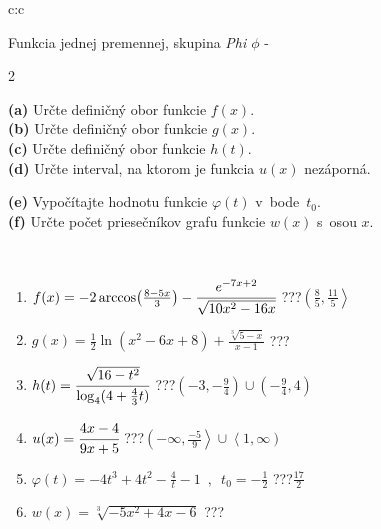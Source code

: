 \documentclass[10pt]{report}
\begin{document}
\begin{tabular}{c:c}
\begin{minipage}[c][104.5mm][t]{0.5\linewidth}
\begin{center}
\vspace{7mm}
{\huge Funkcia jednej premennej, skupina \textit{Phi $\phi$} -}\\[5mm]
\begin{minipage}{0.95\linewidth}
\begin{center}
{\small \begin{multicols}{2} \raggedright
\textbf{(a)} Určte definičný obor funkcie \(f(x)\). \\[1mm]
\textbf{(b)} Určte definičný obor funkcie \(g(x)\). \\[1mm]
\textbf{(c)} Určte definičný obor funkcie \(h(t)\). \\[1mm]
\textbf{(d)} Určte interval, na ktorom je funkcia \(u(x)\) nezáporná. \par \columnbreak
\textbf{(e)} Vypočítajte hodnotu funkcie \(\varphi(t)\) v~bode~\(t_0\). \\[1mm]
\textbf{(f)} Určte počet priesečníkov grafu funkcie \(w(x)\) s~osou \(x\). \\[1mm]
\end{multicols}
}
\end{center}
\end{minipage}
\\[4mm]
\begin{minipage}{0.79\linewidth}
\begin{center}
\begin{varwidth}{\linewidth}
\begin{enumerate}
\small
\item $f(x) = -2\arccos\!\left( \frac{8-5x}{3} \right) - \cfrac{e^{-7x+2}}{\sqrt{10x^2-16x}}$\quad \dotfill\; ???\;\dotfill \quad $\left(\frac{8}{5} , \frac{11}{5}\right\rangle$
\item $g(x) = \frac{1}{2} \ln{\!(x^2-6x+8)}+\frac{\sqrt[3]{5-x}}{x-1}$\quad \dotfill\; ???\;\dotfill {}
\item $h(t) = \cfrac{\sqrt{16-t^2}}{\log_4(4+\frac{4}{3}t)}$\quad \dotfill\; ???\;\dotfill \quad $\left(-3 , -\frac{9}{4}\right)\cup\left(-\frac{9}{4} , 4\right)$
\item $u(x) = \cfrac{4x-4}{9x+5}$\quad \dotfill\; ???\;\dotfill \quad $\left(-\infty , \frac{-5}{9}\right\rangle\cup\left\langle1 , \infty\right)$
\item $\varphi(t) = -4t^3+4t^2-\frac{4}{t}-1 \enspace , \enspace t_0=-\frac{1}{2}$\quad \dotfill\; ???\;\dotfill \quad $\frac{17}{2}$
\item $w(x) = \sqrt[3]{-5x^2+4x-6}$\quad \dotfill\; ???\;\dotfill {}

\end{enumerate}
\end{varwidth}
\end{center}
\end{minipage}
\end{center}
\end{minipage}
\end{tabular}
\end{document}
